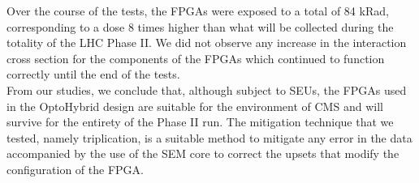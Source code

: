     Over the course of the tests, the FPGAs were exposed to a total of 84 kRad, corresponding to a dose 8 times higher than what will be collected during the totality of the LHC Phase II. We did not observe any increase in the interaction cross section for the components of the FPGAs which continued to function correctly until the end of the tests. \\

    From our studies, we conclude that, although subject to SEUs, the FPGAs used in the OptoHybrid design are suitable for the environment of CMS and will survive for the entirety of the Phase II run. The mitigation technique that we tested, namely triplication, is a suitable method to mitigate any error in the data accompanied by the use of the SEM core to correct the upsets that modify the configuration of the FPGA.
